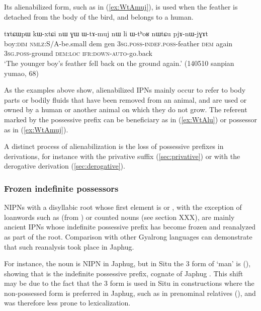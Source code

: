 Its alienabilized form, such as  in (\ref{ex:WtAmuj}), is used when the feather is detached from the body of the bird, and belongs to a human.
  
\begin{exe}
\ex \label{ex:WtAmuj}
 \gll tɤtɕɯpɯ kɯ-xtɕi nɯ ɣɯ ɯ-tɤ-muj nɯ li ɯ-tʰoʁ nɯtɕu pjɤ-nɯ-jɣɤt  \\
 boy:\textsc{dim} \textsc{nmlz}:S/A-be.small dem gen \textsc{3sg.poss}-\textsc{indef.poss}-feather \textsc{dem} again \textsc{3sg.poss}-ground \textsc{dem:loc} \textsc{ifr}:\textsc{down}-\textsc{auto}-go.back  \\
 \glt `The younger boy's feather fell back on the ground again.' (140510 sanpian yumao, 68)
\end{exe}
 
As the examples above show, alienabilized IPNs mainly occur to refer to body parts or bodily fluids that have been removed from an animal, and are used or owned by a human or another animal on which they do not grow. The referent marked by the possessive prefix can be beneficiary as in (\ref{ex:WtAlu}) or possessor as in (\ref{ex:WtAmuj}).
 
 A distinct process of alienabilization is the loss of possessive prefixes in derivations, for instance with the privative suffix (\ref{sec:privative}) or with the derogative derivation (\ref{sec:derogative}).
 
\subsubsection{Frozen indefinite possessors} \label{sec:frozen.indef}
NIPNs with a disyllabic root whose first element is  or , with the exception of loanwords such as  (from ) or counted nouns (see section XXX), are mainly ancient IPNs whose indefinite possessive prefix  has become frozen and reanalyzed as part of the root. Comparison with other Gyalrong languages can demonstrate that such reanalysis took place in Japhug.

For instance, the noun  is NIPN in Japhug, but in Situ the 3\sg{} form of  `man' is   (\citealt[183;197]{lin09phd}), showing that  is the indefinite possessive prefix, cognate of Japhug . This shift may be due to the fact that the 3\sg{} form is used in Situ in constructions where the non-possessed form is preferred in Japhug, such as in prenominal relatives (\citealt[190]{lin09phd}), and was therefore less prone to lexicalization.


